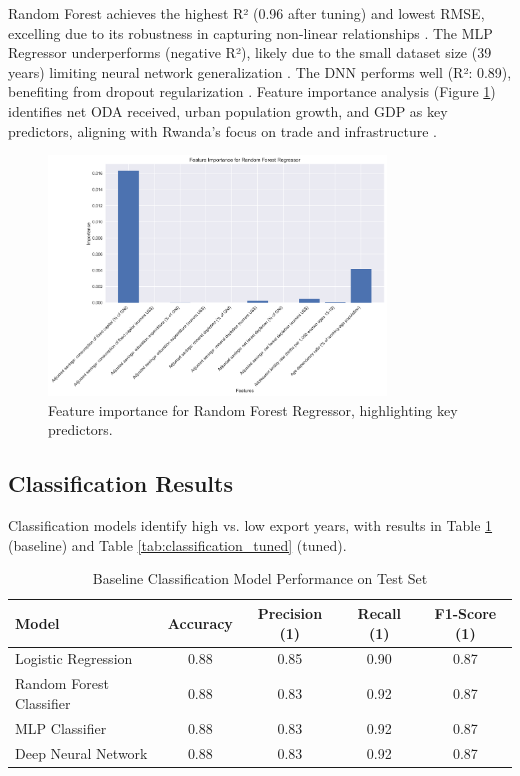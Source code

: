 \documentclass[12pt]{article}
\begin{document}
	Random Forest achieves the highest R² (0.96 after tuning) and lowest RMSE, excelling due to its robustness in capturing non-linear relationships \citep{breiman}. The MLP Regressor underperforms (negative R²), likely due to the small dataset size (39 years) limiting neural network generalization \citep{goodfellow}. The DNN performs well (R²: 0.89), benefiting from dropout regularization \citep{tensorflow}. Feature importance analysis (Figure \ref{fig:feature_importance}) identifies net ODA received, urban population growth, and GDP as key predictors, aligning with Rwanda's focus on trade and infrastructure \citep{rwanda_vision}.
	
	\begin{figure}[H]
		\centering
		\includegraphics[width=0.8\textwidth]{../feature_importance.png}
		\caption{Feature importance for Random Forest Regressor, highlighting key predictors.}
		\label{fig:feature_importance}
	\end{figure}
	
	\subsection{Classification Results}
	Classification models identify high vs. low export years, with results in Table \ref{tab:classification_base} (baseline) and Table \ref{tab:classification_tuned} (tuned).
	
	\begin{table}[H]
		\centering
		\caption{Baseline Classification Model Performance on Test Set}
		\begin{tabular}{lcccc}
			\toprule
			Model & Accuracy & Precision (1) & Recall (1) & F1-Score (1) \\
			\midrule
			Logistic Regression & 0.88 & 0.85 & 0.90 & 0.87 \\
			Random Forest Classifier & 0.88 & 0.83 & 0.92 & 0.87 \\
			MLP Classifier & 0.88 & 0.83 & 0.92 & 0.87 \\
			Deep Neural Network & 0.88 & 0.83 & 0.92 & 0.87 \\
			\bottomrule
		\end{tabular}
		\label{tab:classification_base}
	\end{table}
	
\end{document}

